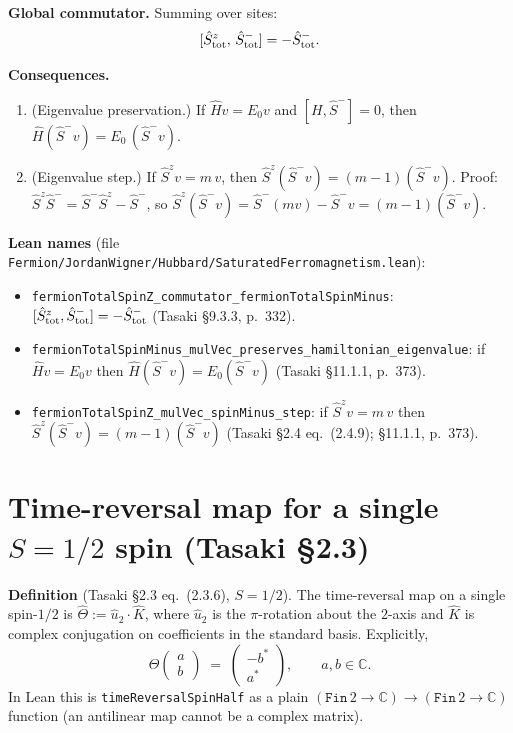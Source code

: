 \documentclass[a4paper,11pt]{article}
\begin{document}
\noindent\textbf{Global commutator.}
Summing over sites:
\[
  [\hat S^z_{\rm tot},\,\hat S^-_{\rm tot}] = -\hat S^-_{\rm tot}.
\]

\noindent\textbf{Consequences.}
\begin{enumerate}
\item (Eigenvalue preservation.)
  If $\hat H v = E_0 v$ and $[H, \hat S^-] = 0$, then
  $\hat H(\hat S^- v) = E_0\,(\hat S^- v)$.
\item (Eigenvalue step.)
  If $\hat S^z v = m\,v$, then
  $\hat S^z(\hat S^- v) = (m-1)(\hat S^- v)$.
  Proof: $\hat S^z \hat S^- = \hat S^- \hat S^z - \hat S^-$, so
  $\hat S^z(\hat S^- v) = \hat S^-(mv) - \hat S^- v = (m-1)(\hat S^- v)$.
\end{enumerate}

\noindent\textbf{Lean names}
(file \texttt{Fermion/JordanWigner/Hubbard/SaturatedFerromagnetism.lean}):
\begin{itemize}
  \item \texttt{fermionTotalSpinZ\_commutator\_fermionTotalSpinMinus}:
    $[\hat S^z_{\rm tot},\hat S^-_{\rm tot}] = -\hat S^-_{\rm tot}$
    (Tasaki §9.3.3, p.~332).
  \item \texttt{fermionTotalSpinMinus\_mulVec\_preserves\_hamiltonian\_eigenvalue}:
    if $\hat H v = E_0 v$ then $\hat H(\hat S^- v) = E_0(\hat S^- v)$
    (Tasaki §11.1.1, p.~373).
  \item \texttt{fermionTotalSpinZ\_mulVec\_spinMinus\_step}:
    if $\hat S^z v = m\,v$ then $\hat S^z(\hat S^- v) = (m-1)(\hat S^- v)$
    (Tasaki §2.4 eq.~(2.4.9); §11.1.1, p.~373).
\end{itemize}

\section{Time-reversal map for a single \(S = 1/2\) spin (Tasaki §2.3)}
\label{sec:time-reversal-spin-half}

\noindent\textbf{Definition} (Tasaki §2.3 eq.~(2.3.6), \(S = 1/2\)).
The time-reversal map on a single spin-\(1/2\) is
\(\hat{\Theta} := \hat{u}_2 \cdot \hat{K}\), where \(\hat{u}_2\) is
the \(\pi\)-rotation about the \(2\)-axis and \(\hat{K}\) is complex
conjugation on coefficients in the standard basis. Explicitly,
\[
  \hat{\Theta}\!\begin{pmatrix} a \\ b \end{pmatrix}
  \;=\; \begin{pmatrix} -b^{*} \\ a^{*} \end{pmatrix},
  \qquad a, b \in \mathbb{C}.
\]
In Lean this is \texttt{timeReversalSpinHalf} as a plain
\((\texttt{Fin}\,2 \to \mathbb{C}) \to (\texttt{Fin}\,2 \to \mathbb{C})\)
function (an antilinear map cannot be a complex matrix).
\end{document}
